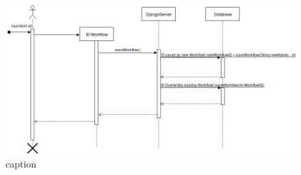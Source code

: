 \begin{itemize}
    \begin{figure}[h]
      \centering
      \includegraphics[width=15cm]{images/sqd_save_workflow.jpg}
      \caption{caption}
      \label{fig:sqd_save_wf}
    \end{figure}

\end{itemize}
